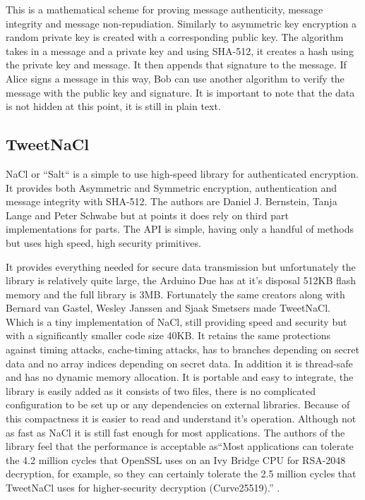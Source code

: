 This is a mathematical scheme for proving message authenticity, message integrity and message non-repudiation. Similarly to asymmetric key encryption a random private key is created with a corresponding public key. The algorithm takes in a message and a private key and using SHA-512, it creates a hash using the private key and message. It then appends that signature to the message. If Alice signs a message in this way, Bob can use another algorithm to verify the message with the public key and signature. It is important to note that the data is not hidden at this point, it is still in plain text.

\subsection{TweetNaCl}

NaCl or ``Salt`` is a simple to use high-speed library for authenticated encryption. It provides both Asymmetric and Symmetric encryption, authentication and message integrity with SHA-512. The authors are Daniel J. Bernstein, Tanja Lange and Peter Schwabe but at points it does rely on third part implementations for parts. The API is simple, having only a handful of methods but uses high speed, high security primitives\cite{naclsmall}.

It provides everything needed for secure data transmission but unfortunately the library is relatively quite large, the Arduino Due has at it's disposal 512KB flash memory and the full library is 3MB. Fortunately the same creators along with Bernard van Gastel, Wesley Janssen and Sjaak Smetsers made TweetNaCl. Which is a tiny implementation of NaCl, still providing speed and security but with a significantly smaller code size 40KB. It retains the same protections against timing attacks, cache-timing attacks, has to branches depending on secret data and no array indices depending on secret data. In addition it is thread-safe and has no dynamic memory allocation\cite{tweetnacl}. It is portable and easy to integrate, the library is easily added as it consists of two files, there is no complicated configuration to be set up or any dependencies on external libraries. Because of this compactness it is easier to read and understand it's operation. Although not as fast as NaCl it is still fast enough for most applications. The authors of the library feel that the performance is acceptable as``Most applications can tolerate the 4.2 million cycles that OpenSSL uses on an Ivy Bridge CPU for RSA-2048 decryption, for example, so they can certainly tolerate the 2.5 million cycles that TweetNaCl uses for higher-security decryption (Curve25519).'' \cite{tweetnacl3}.

